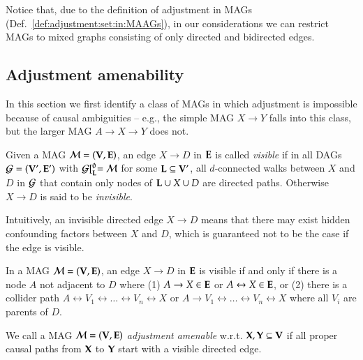 Notice that, due to the definition of adjustment in MAGs (Def.~\ref{def:adjustment:set:in:MAAGs}), in our considerations
we can restrict MAGs to mixed graphs consisting of only directed and bidirected edges.

\subsection{Adjustment amenability}


In this section we first identify a class of MAGs in which
adjustment is impossible because of causal ambiguities -- e.g.,
the simple MAG $X \to Y$ falls into this class, but the
larger MAG $A \to X \to Y$ does not. 

\begin{definition}
Given a MAG ${\cal M}=({\bf V},{\bf E})$, an edge 
$X \to D$ in ${\bf E}$ is called \emph{visible} if in all DAGs 
${\cal G}=({\bf V}',{\bf E}')$ with
${\cal G}[^\emptyset_{\bf L}={\cal M}$ for some ${\bf L} \subseteq {\bf V}'$,
all $d$-connected
walks between $X$ and $D$ in ${\cal G}$ that contain only
nodes of ${\bf L}\cup X\cup D$
are directed paths.
 Otherwise $X \to D$ is said to be \emph{invisible}.
\end{definition}

Intuitively, an invisible directed edge $X \to D$ 
means that there may exist hidden confounding factors
between $X$ and $D$, which is guaranteed not to be the case if the edge is visible.

\begin{lemma}
In a MAG  ${\cal M}=({\bf V},{\bf E})$, an edge $X \to D$ in ${\bf E}$ is visible if and only if
there is a node $A$ not adjacent to $D$ where 
(1) $A \to X \in {\bf E}$ or
$A \leftrightarrow X \in {\bf E}$, or (2) there is a collider path
$A \leftrightarrow V_1 \leftrightarrow \ldots \leftrightarrow V_n 
\leftrightarrow X$ 
or $A \to V_1 \leftrightarrow \ldots \leftrightarrow V_n 
\leftrightarrow X$ where all $V_i$ are
parents of $D$. 
\label{lemma:pureedge}
\end{lemma}

\begin{definition}
We call a MAG ${\cal M}=({\bf V},{\bf E})$ \emph{adjustment amenable} w.r.t.
${\bf X},{\bf Y} \subseteq {\bf V}$ if all
proper causal paths from ${\bf X}$ to ${\bf Y}$ start with a 
visible directed edge.
\end{definition}

